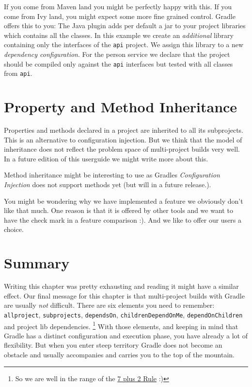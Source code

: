 If you come from Maven land you might be perfectly happy with this. If you come from Ivy land, you might expect some more fine grained control. Gradle offers this to you:
The Java plugin adds per default a jar to your project libraries which contains all the classes. In this example we create an \emph{additional} library containing only the interfaces of the \texttt{api} project. We assign this library to a new \emph{dependency configuration}. For the person service we declare that the project should be compiled only against the \texttt{api} interfaces but tested with all classes from \texttt{api}.

\section{Property and Method Inheritance} %
\label{sec:property_and_method_inheritance}
Properties and methods declared in a project are inherited to all its subprojects. This is an alternative to configuration injection. But we think that the model of inheritance does not reflect the problem space of multi-project builds very well. In a future edition of this userguide we might write more about this. 

Method inheritance might be interesting to use as Gradles \emph{Configuration Injection} does not support methods yet (but will in a future release.).

You might be wondering why we have implemented a feature we obviously don't like that much. One reason is that it is offered by other tools and we want to have the check mark in a feature comparison :). And we like to offer our users a choice.

\section{Summary} %
Writing this chapter was pretty exhausting and reading it might have a similar effect. Our final message for this chapter is that multi-project builds with Gradle are usually \emph{not} difficult. There are six elements you need to remember: \texttt{allproject}, \texttt{subprojects}, \texttt{dependsOn}, \texttt{childrenDependOnMe}, \texttt{dependOnChildren} and project lib dependencies. 
\footnote{So we are well in the range of the \href{http://en.wikipedia.org/wiki/The_Magical_Number_Seven,_Plus_or_Minus_Two}{7 plus 2 Rule} :)}
With those elements, and keeping in mind that Gradle has a distinct configuration and execution phase, you have already a lot of flexibility. But when you enter steep territory Gradle does not become an obstacle and usually accompanies and carries you to the top of the mountain.


